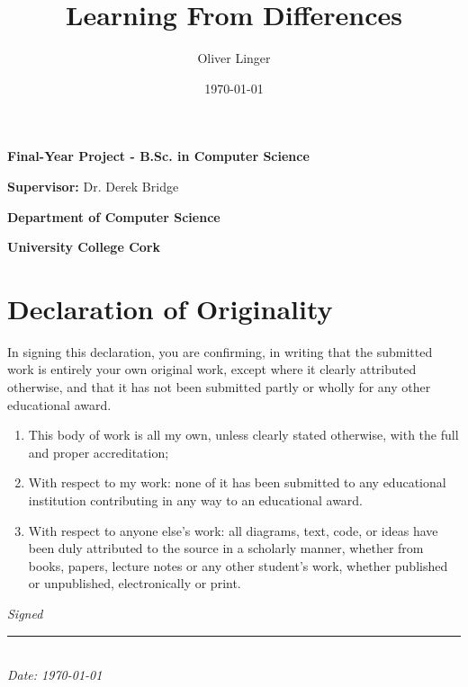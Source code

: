 \documentclass[a4paper, 12pt]{report}
\title{Learning From Differences}
\author{Oliver Linger}
\date{\today}
\begin{document}
\maketitle

\vspace*{\fill} %

\centering
\textbf{Final-Year Project - B.Sc. in Computer Science}

\textbf{Supervisor:} Dr. Derek Bridge

\textbf{Department of Computer Science}

\textbf{University College Cork}

\vspace*{\fill} %

\begin{abstract}
\end{abstract}


\section*{Declaration of Originality}
In signing this declaration, you are confirming, in writing that the submitted
work is entirely your own original work, except where it clearly attributed otherwise,
and that it has not been submitted partly or wholly for any other educational award.
\begin{enumerate}
    \item This body of work is all my own, unless clearly stated otherwise, with the full and proper accreditation;
    \item With respect to my work: none of it has been submitted to any educational institution contributing in any way to an educational award.
    \item With respect to anyone else's work: all diagrams, text, code, or ideas have been duly attributed to the source in a scholarly manner,
          whether from books, papers, lecture notes or any other student's work, whether published or unpublished, electronically or print.
\end{enumerate}

\vspace{2em} %

\begin{flushright}
    \textit{Signed} \\
    \rule{6cm}{0.4pt} \\
    \textit{Date: \today}
\end{flushright}
\end{document}
